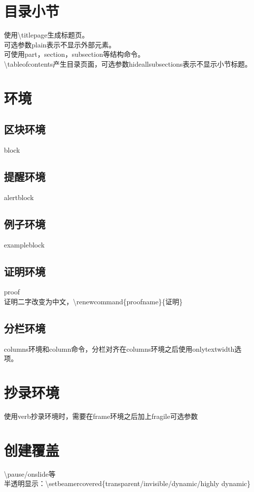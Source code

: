 \documentclass{book}%
\begin{document}
    \section{目录小节}
    使用\textbackslash titlepage生成标题页。\\
    可选参数plain表示不显示外部元素。\\
    可使用part，section，subsection等结构命令。\\
    \textbackslash tableofcontents产生目录页面，可选参数hideallsubsections表示不显示小节标题。
    
    \section{环境}
    
    \subsection{区块环境}
    block
    
    \subsection{提醒环境}
    alertblock
    
    \subsection{例子环境}
    exampleblock
    
    \subsection{证明环境}
    proof\\
    证明二字改变为中文，\textbackslash renewcommand\{proofname\}\{证明\}
    
    \subsection{分栏环境}
    columns环境和column命令，分栏对齐在columns环境之后使用onlytextwidth选项。    
    
    \section{抄录环境}
    使用verb抄录环境时，需要在frame环境之后加上fragile可选参数
    
    \section{创建覆盖}
    \textbackslash pause/onslide等\\
    半透明显示：\textbackslash setbeamercovered\{transparent/invisible/dynamic/highly dynamic\}
    
\end{document}
